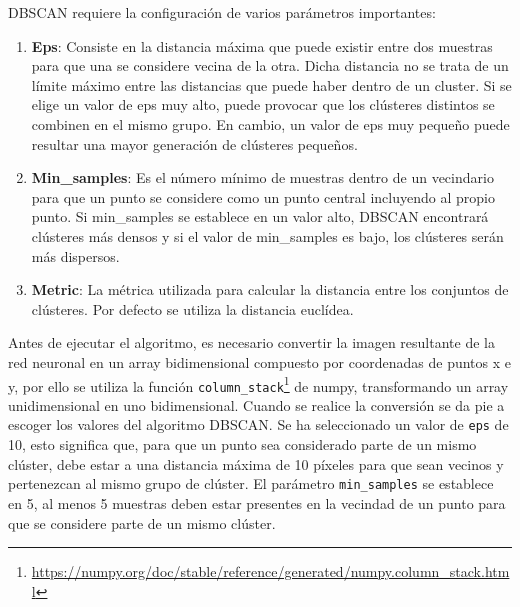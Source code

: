DBSCAN requiere la configuración de varios parámetros importantes:
\begin{enumerate}
  \item \textbf{Eps}: Consiste en la distancia máxima que puede existir entre dos muestras para que una se considere vecina de la otra. Dicha distancia no se trata de un límite 
  máximo entre las distancias que puede haber dentro de un cluster. Si se elige un valor de eps muy alto, puede provocar que los clústeres distintos se combinen en el mismo grupo. 
  En cambio, un valor de eps muy pequeño puede resultar una mayor generación de clústeres pequeños.
  \item \textbf{Min\_samples}: Es el número mínimo de muestras dentro de un vecindario para que un punto se considere como un punto central incluyendo al propio punto.
  Si min\_samples se establece en un valor alto, DBSCAN encontrará clústeres más densos y 
  si el valor de min\_samples es bajo, los clústeres serán más dispersos.
  \item \textbf{Metric}: La métrica utilizada para calcular la distancia entre los conjuntos de clústeres. Por defecto se utiliza la distancia euclídea. 
\end{enumerate}

Antes de ejecutar el algoritmo, es necesario convertir la imagen resultante de la red neuronal en un array bidimensional compuesto por coordenadas de puntos x e y, por ello se utiliza
la función \texttt{column\_stack}\footnote{\url{https://numpy.org/doc/stable/reference/generated/numpy.column_stack.html}} de numpy, transformando un array
unidimensional en uno bidimensional. Cuando se realice la conversión se da pie a escoger los valores del algoritmo DBSCAN. Se ha seleccionado un valor de \texttt{eps} de 10, esto significa que, 
para que un punto sea considerado parte de un mismo clúster, debe estar a una distancia máxima de 10 píxeles para que sean vecinos y pertenezcan al mismo grupo de clúster. 
El parámetro \texttt{min\_samples} se establece en 5, al menos 5 muestras 
deben estar presentes en la vecindad de un punto para que se considere parte de un mismo clúster. 

